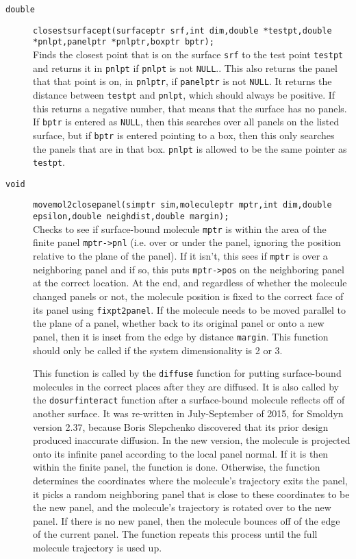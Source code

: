\documentclass {book}
\begin{document}
\begin{description}
\item[\texttt{double}]
\texttt{closestsurfacept(surfaceptr srf,int dim,double *testpt,double *pnlpt,panelptr *pnlptr,boxptr bptr);}
\hfill \\
Finds the closest point that is on the surface \texttt{srf} to the test point \texttt{testpt} and returns it in \texttt{pnlpt} if \texttt{pnlpt} is not \texttt{NULL}..  This also returns the panel that that point is on, in \texttt{pnlptr}, if \texttt{panelptr} is not \texttt{NULL}.  It returns the distance between \texttt{testpt} and \texttt{pnlpt}, which should always be positive.  If this returns a negative number, that means that the surface has no panels.  If \texttt{bptr} is entered as \texttt{NULL}, then this searches over all panels on the listed surface, but if \texttt{bptr} is entered pointing to a box, then this only searches the panels that are in that box.  \texttt{pnlpt} is allowed to be the same pointer as \texttt{testpt}.

\item[\texttt{void}]
\texttt{movemol2closepanel(simptr sim,moleculeptr mptr,int dim,double epsilon,double neighdist,double margin);}
\hfill \\
Checks to see if surface-bound molecule \texttt{mptr} is within the area of the finite panel \texttt{mptr->pnl} (i.e. over or under the panel, ignoring the position relative to the plane of the panel).  If it isn't, this sees if \texttt{mptr} is over a neighboring panel and if so, this puts \texttt{mptr->pos} on the neighboring panel at the correct location.  At the end, and regardless of whether the molecule changed panels or not, the molecule position is fixed to the correct face of its panel using \texttt{fixpt2panel}.  If the molecule needs to be moved parallel to the plane of a panel, whether back to its original panel or onto a new panel, then it is inset from the edge by distance \texttt{margin}.  This function should only be called if the system dimensionality is 2 or 3.

This function is called by the \texttt{diffuse} function for putting surface-bound molecules in the correct places after they are diffused.  It is also called by the \texttt{dosurfinteract} function after a surface-bound molecule reflects off of another surface.  It was re-written in July-September of 2015, for Smoldyn version 2.37, because Boris Slepchenko discovered that its prior design produced inaccurate diffusion.  In the new version, the molecule is projected onto its infinite panel according to the local panel normal.  If it is then within the finite panel, the function is done.  Otherwise, the function determines the coordinates where the molecule's trajectory exits the panel, it picks a random neighboring panel that is close to these coordinates to be the new panel, and the molecule's trajectory is rotated over to the new panel.  If there is no new panel, then the molecule bounces off of the edge of the current panel.  The function repeats this process until the full molecule trajectory is used up.


\end{description}
\end{document}
